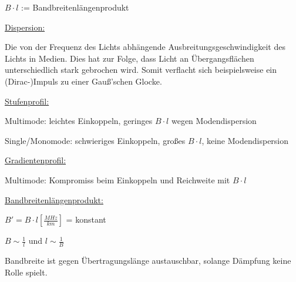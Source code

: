 $B\cdot l$ := Bandbreitenlängenprodukt

\underline{Dispersion:}

    \footnotesize{Die von der Frequenz des Lichts abhängende Ausbreitungsgeschwindigkeit des Lichts in Medien.
    Dies hat zur Folge, dass Licht an Übergangsflächen unterschiedlich stark gebrochen wird.
    Somit verflacht sich beispielsweise ein (Dirac-)Impuls zu einer Gauß'schen Glocke.}

    \underline{Stufenprofil:}

    \footnotesize{Multimode: leichtes Einkoppeln, geringes $B\cdot l$ wegen Modendispersion

    Single/Monomode: schwieriges Einkoppeln, großes $B\cdot l$, keine Modendispersion

    }
    \underline{Gradientenprofil:}

    \footnotesize{Multimode: Kompromiss beim Einkoppeln und Reichweite mit $B\cdot l$}

    \underline{Bandbreitenlängenprodukt:}

    \footnotesize{$B' =  B\cdot l[\frac{MHz}{km}]$ = konstant

    $B \sim \frac{1}{l}$ und $l\sim \frac{1}{B}$

    Bandbreite ist gegen Übertragungslänge austauschbar, solange Dämpfung keine Rolle spielt.}